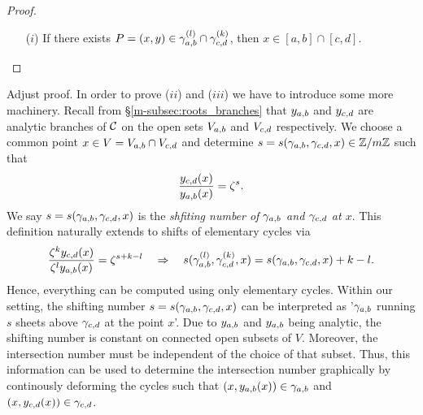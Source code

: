 \documentclass[main.tex]{subfiles}
\begin{document}

  \begin{proof}\let\qed\relax
   \begin{itemize}
    \item[($i$)] If there exists $P = (x,y) \in \gamma_{a,b}^{(l)} \cap \gamma_{c,d}^{(k)}$, then  $x \in [a,b] \cap [c,d]$.
   \end{itemize}
  \end{proof}
  \todo Adjust proof.
  In order to prove ($ii$) and ($iii$) we have to introduce some more machinery. Recall from \S \ref{m-subsec:roots_branches} that $y_{a,b}$ and $y_{c,d}$ are analytic branches of $\mathcal{C}$ on the open sets
  $V_{a,b}$ and $V_{c,d}$ respectively. \abstandl
  We choose a common point $x \in V = V_{a,b} \cap V_{c,d}$ and determine $s  = s(\gamma_{a,b},\gamma_{c,d},x) \in \mathbb{Z}/m\mathbb{Z}$  such that
  \begin{align}
   \frac{y_{c,d}(x)}{y_{a,b}(x)} = \zeta^s .
  \end{align}
  We say $s  = s(\gamma_{a,b},\gamma_{c,d},x)$ is the \emph{shfiting number of $\gamma_{a,b}$ and $\gamma_{c,d}$ at $x$}.
  This definition naturally extends to shifts of elementary cycles via
\begin{align}\label{eq:shift_numb_rel}
  \frac{\zeta^ky_{c,d}(x)}{\zeta^ly_{a,b}(x)} = \zeta^{s+k-l} \quad \Rightarrow \quad s(\gamma_{a,b}^{(l)},\gamma_{c,d}^{(k)},x) = s(\gamma_{a,b},\gamma_{c,d},x) + k - l.
\end{align}
 Hence, everything can be computed using only elementary cycles. \abstandl
 Within our setting, the shifting number $s=s(\gamma_{a,b},\gamma_{c,d},x)$  can be interpreted as '$\gamma_{a,b}$ running $s$ sheets above $\gamma_{c,d}$ at the point $x$'.
 Due to $y_{a,b}$ and $y_{a,b}$ being analytic, the shifting number is constant on connected open subsets of $V$. Moreover, the intersection number must be independent of the choice of that subset. \abstandl
 Thus,
 this information can be used to determine
 the intersection number graphically by continously deforming the cycles such that $(x,y_{a,b}(x)) \in \gamma_{a,b}$ and $(x,y_{c,d}(x)) \in \gamma_{c,d}$.
\end{document}
